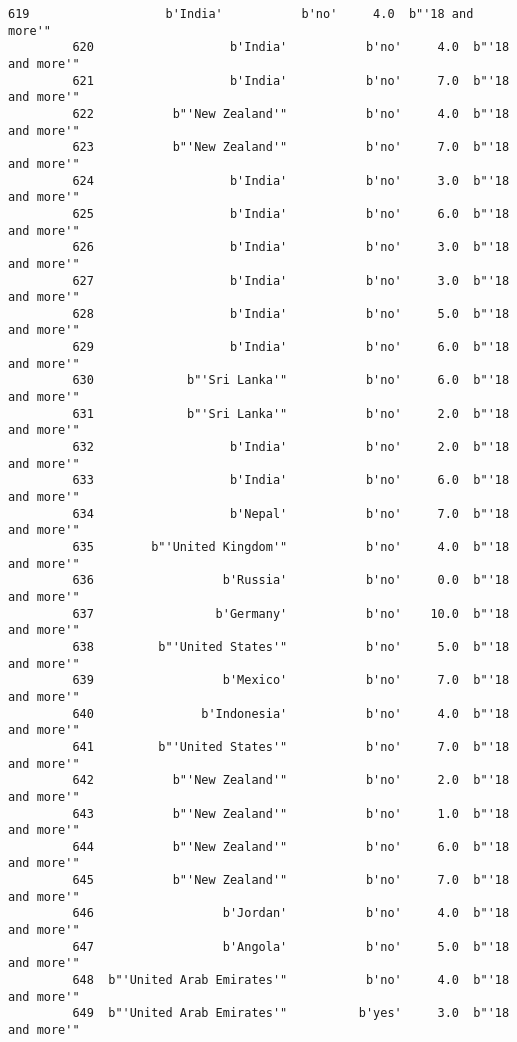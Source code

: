 \documentclass[11pt]{article}
\begin{document}
\begin{Verbatim}[commandchars=\\\{\}]
         619                   b'India'           b'no'     4.0  b"'18 and more'"   
         620                   b'India'           b'no'     4.0  b"'18 and more'"   
         621                   b'India'           b'no'     7.0  b"'18 and more'"   
         622           b"'New Zealand'"           b'no'     4.0  b"'18 and more'"   
         623           b"'New Zealand'"           b'no'     7.0  b"'18 and more'"   
         624                   b'India'           b'no'     3.0  b"'18 and more'"   
         625                   b'India'           b'no'     6.0  b"'18 and more'"   
         626                   b'India'           b'no'     3.0  b"'18 and more'"   
         627                   b'India'           b'no'     3.0  b"'18 and more'"   
         628                   b'India'           b'no'     5.0  b"'18 and more'"   
         629                   b'India'           b'no'     6.0  b"'18 and more'"   
         630             b"'Sri Lanka'"           b'no'     6.0  b"'18 and more'"   
         631             b"'Sri Lanka'"           b'no'     2.0  b"'18 and more'"   
         632                   b'India'           b'no'     2.0  b"'18 and more'"   
         633                   b'India'           b'no'     6.0  b"'18 and more'"   
         634                   b'Nepal'           b'no'     7.0  b"'18 and more'"   
         635        b"'United Kingdom'"           b'no'     4.0  b"'18 and more'"   
         636                  b'Russia'           b'no'     0.0  b"'18 and more'"   
         637                 b'Germany'           b'no'    10.0  b"'18 and more'"   
         638         b"'United States'"           b'no'     5.0  b"'18 and more'"   
         639                  b'Mexico'           b'no'     7.0  b"'18 and more'"   
         640               b'Indonesia'           b'no'     4.0  b"'18 and more'"   
         641         b"'United States'"           b'no'     7.0  b"'18 and more'"   
         642           b"'New Zealand'"           b'no'     2.0  b"'18 and more'"   
         643           b"'New Zealand'"           b'no'     1.0  b"'18 and more'"   
         644           b"'New Zealand'"           b'no'     6.0  b"'18 and more'"   
         645           b"'New Zealand'"           b'no'     7.0  b"'18 and more'"   
         646                  b'Jordan'           b'no'     4.0  b"'18 and more'"   
         647                  b'Angola'           b'no'     5.0  b"'18 and more'"   
         648  b"'United Arab Emirates'"           b'no'     4.0  b"'18 and more'"   
         649  b"'United Arab Emirates'"          b'yes'     3.0  b"'18 and more'"   

\end{Verbatim}
\end{document}
